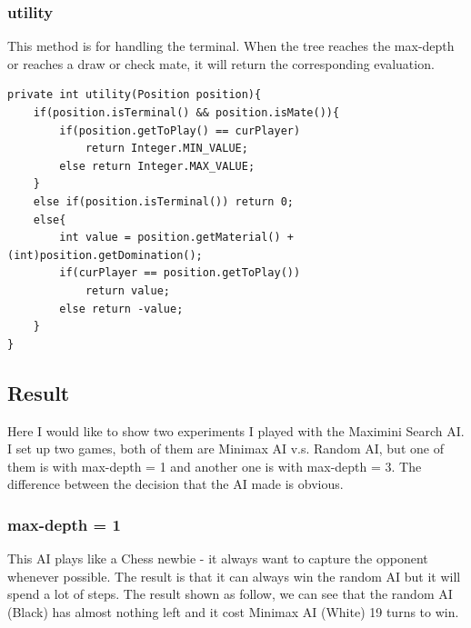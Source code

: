 \documentclass{article}
\begin{document}
\subsubsection{utility}
This method is for handling the terminal. When the tree reaches the max-depth or reaches a draw or check mate, it will return the corresponding evaluation.
\begin{lstlisting}
private int utility(Position position){
	if(position.isTerminal() && position.isMate()){
		if(position.getToPlay() == curPlayer)
			return Integer.MIN_VALUE;
		else return Integer.MAX_VALUE;
	}
	else if(position.isTerminal()) return 0;
	else{
		int value = position.getMaterial() + (int)position.getDomination();
		if(curPlayer == position.getToPlay())
			return value;
		else return -value;
	}
}
\end{lstlisting}

\subsection{Result}
Here I would like to show two experiments I played with the Maximini Search AI. I set up two games, both of them are Minimax AI v.s. Random AI, but one of them is with max-depth = 1 and another one is with max-depth = 3. The difference between the decision that the AI made is obvious.
\clearpage
\subsubsection{max-depth = 1}
This AI plays like a Chess newbie - it always want to capture the opponent whenever possible. The result is that it can always win the random AI but it will spend a lot of steps. The result shown as follow, we can see that the random AI (Black) has almost nothing left and it cost Minimax AI (White) 19 turns to win.
\end{document}
